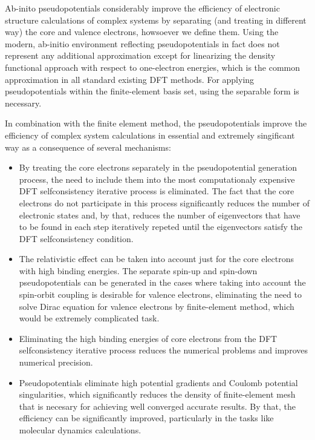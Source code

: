 Ab-inito pseudopotentials \cite{pickett} considerably improve the efficiency of
electronic structure calculations of complex systems by separating (and
treating in different way) the core and valence electrons, howsoever we define
them.  Using the modern, ab-initio environment reflecting pseudopotentials
\cite{vackarAEPP2} in fact does not represent any additional approximation
except for linearizing the density functional approach with respect to
one-electron energies, which is the common approximation in all standard
existing DFT methods.  For applying pseudopotentials within the finite-element
basis set, using the separable form is necessary.

In combination with the finite element method, the pseudopotentials improve the
efficiency of complex system calculations in essential and extremely
singificant way as a consequence of several mechanisms:
\begin{itemize}

\item By treating the core electrons separately in the pseudopotential
generation process, the need to include them into the most computationaly
expensive DFT selfconsistency iterative process is eliminated.  The fact that
the core electrons do not participate in this process significantly reduces the
number of electronic states and, by that, reduces the number of eigenvectors
that have to be found in each step iteratively repeted until the eigenvectors
satisfy the DFT selfconsistency condition.

\item The relativistic effect can be taken into account just for the core
electrons with high binding energies. The separate spin-up and spin-down
pseudopotentials can be generated in the cases where taking into account the
spin-orbit coupling is desirable for valence electrons, eliminating the need to
solve Dirac equation for valence electrons by finite-element method, which
would be extremely complicated task.

\item Eliminating the high binding energies of core electrons from the DFT
selfconsistency iterative process reduces the numerical problems and improves
numerical precision.

\item Pseudopotentials eliminate high potential gradients and Coulomb potential
singularities, which significantly reduces the density of finite-element mesh
that is necesary for achieving well converged accurate results. By that, the
efficiency can be significantly improved, particularly in the tasks like
molecular dynamics calculations.

\end{itemize}
